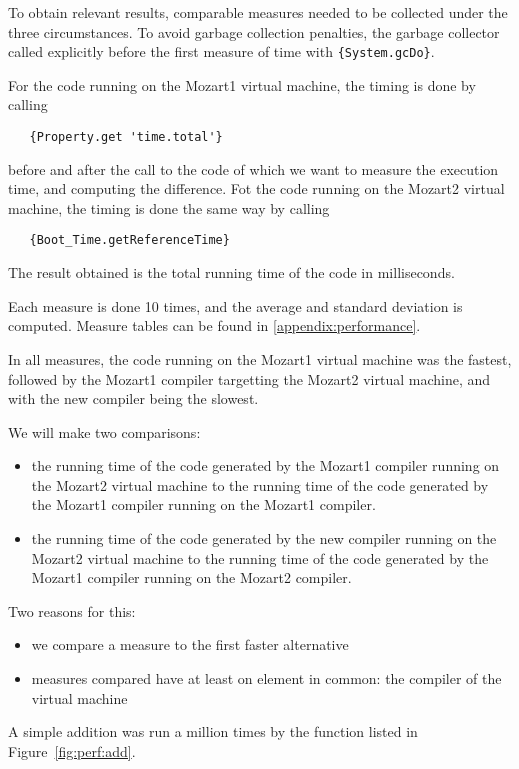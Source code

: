 \documentclass[a4paper]{memoir}
\begin{document}
To obtain relevant results, comparable measures needed to be collected under the
three circumstances.
To avoid garbage collection penalties, the garbage collector called explicitly before the
first measure of time with \lstinline!{System.gcDo}!.

For the code running on the Mozart1 virtual machine, the timing is done by
calling 
\begin{lstlisting}
   {Property.get 'time.total'}
\end{lstlisting}
before and after the call to the code of which we want to measure the execution
time, and computing the difference. Fot the code running on the Mozart2 virtual machine, the timing is done
the same way by calling 
\begin{lstlisting}
   {Boot_Time.getReferenceTime}
\end{lstlisting}
The result obtained is the total running time of the code in milliseconds.

Each measure is done 10 times, and the average and standard deviation is
computed. Measure tables can be found in \ref{appendix:performance}.

In all measures, the code running on the Mozart1 virtual machine was the
fastest, followed by the Mozart1 compiler targetting the Mozart2 virtual
machine, and with the new compiler being the slowest.

We will make two comparisons:
\begin{itemize}
  \item the running time of the code generated by the Mozart1 compiler running
    on the Mozart2 virtual machine to the running time of the code generated by
    the Mozart1 compiler running on the Mozart1 compiler.
  \item the running time of the code generated by the new compiler running
    on the Mozart2 virtual machine to the running time of the code generated by
    the Mozart1 compiler running on the Mozart2 compiler.
\end{itemize}
Two reasons for this:
\begin{itemize}
  \item we compare a measure to the first faster alternative
  \item measures compared have at least on element in common: the compiler of
    the virtual machine
\end{itemize}

A simple addition was run a million times by the function listed in Figure~\ref{fig:perf:add}.
\end{document}
